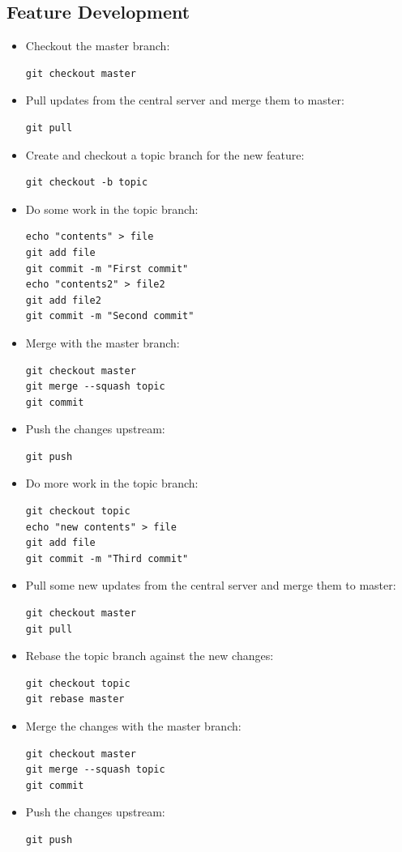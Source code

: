 \documentclass[a4paper,10pt]{article}
\begin{document}
\subsection{Feature Development}
\begin{itemize}
  \item Checkout the master branch:
    \begin{lstlisting}
git checkout master
    \end{lstlisting}
  \item Pull updates from the central server and merge them to master:
    \begin{lstlisting}
git pull
    \end{lstlisting}
  \item Create and checkout a topic branch for the new feature:
    \begin{lstlisting}
git checkout -b topic
    \end{lstlisting}
  \item Do some work in the topic branch:
    \begin{lstlisting}
echo "contents" > file
git add file
git commit -m "First commit"
echo "contents2" > file2
git add file2
git commit -m "Second commit"
    \end{lstlisting}
  \item Merge with the master branch:
    \begin{lstlisting}
git checkout master
git merge --squash topic
git commit
    \end{lstlisting}
  \item Push the changes upstream:
    \begin{lstlisting}
git push
    \end{lstlisting}
  \item Do more work in the topic branch:
    \begin{lstlisting}
git checkout topic
echo "new contents" > file
git add file
git commit -m "Third commit"
    \end{lstlisting}
  \item Pull some new updates from the central server and merge them to master:
    \begin{lstlisting}
git checkout master
git pull
    \end{lstlisting}
  \item Rebase the topic branch against the new changes:
    \begin{lstlisting}
git checkout topic
git rebase master
    \end{lstlisting}
  \item Merge the changes with the master branch:
    \begin{lstlisting}
git checkout master
git merge --squash topic
git commit
    \end{lstlisting}
  \item Push the changes upstream:
    \begin{lstlisting}
git push
    \end{lstlisting}




\end{itemize}
\end{document}
